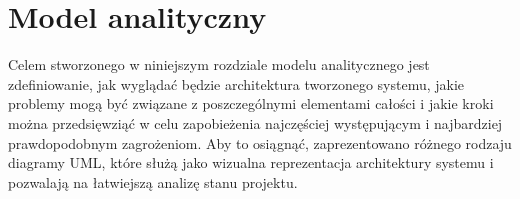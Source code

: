 \newpage
\section{Model analityczny}

Celem stworzonego w niniejszym rozdziale modelu analitycznego jest
zdefiniowanie, jak wyglądać będzie architektura tworzonego systemu, jakie
problemy mogą być związane z poszczególnymi elementami całości i jakie kroki
można przedsięwziąć w celu zapobieżenia najczęściej występującym i najbardziej
prawdopodobnym zagrożeniom. Aby to osiągnąć, zaprezentowano różnego rodzaju
diagramy UML, które służą jako wizualna reprezentacja architektury systemu i
pozwalają na łatwiejszą analizę stanu projektu.

